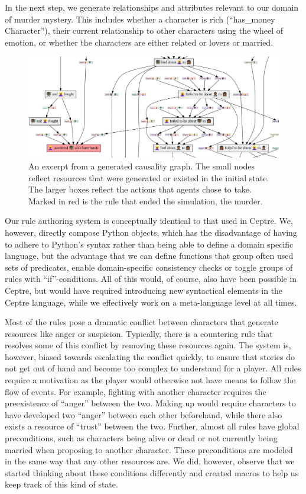 In the next step, we generate relationships and attributes relevant to our domain of murder mystery. This includes whether a character is rich (\enquote{has\_money Character}), their current relationship to other characters using the wheel of emotion, or whether the characters are either related or lovers or married.

\begin{figure}
  \includegraphics[width=\textwidth]{graph.png}
  \caption{An excerpt from a generated causality graph. The small nodes reflect resources that were generated or existed in the initial state. The larger boxes reflect the actions that agents chose to take. Marked in red is the rule that ended the simulation, the murder.}
\end{figure}

Our rule authoring system is conceptually identical to that used in Ceptre. We, however, directly compose Python objects, which has the disadvantage of having to adhere to Python's syntax rather than being able to define a domain specific language, but the advantage that we can define functions that group often used sets of predicates, enable domain-specific consistency checks or toggle groups of rules with \enquote{if}-conditions. All of this would, of course, also have been possible in Ceptre, but would have required introducing new syntactical elements in the Ceptre language, while we effectively work on a meta-language level at all times.

Most of the rules pose a dramatic conflict between characters that generate resources like anger or suspicion.
Typically, there is a countering rule that resolves some of this conflict by removing these resources again.
The system is, however, biased towards escalating the conflict quickly, to ensure that stories do not get out of hand and become too complex to understand for a player.
All rules require a motivation as the player would otherwise not have means to follow the flow of events.
For example, fighting with another character requires the preexistence of \enquote{anger} between the two.
Making up would require characters to have developed two \enquote{anger} between each other beforehand, while there also exists a resource of \enquote{trust} between the two.
Further, almost all rules have global preconditions, such as characters being alive or dead or not currently being married when proposing to another character.
These preconditions are modeled in the same way that any other resources are.
We did, however, observe that we started thinking about these conditions differently and created macros to help us keep track of this kind of state.

